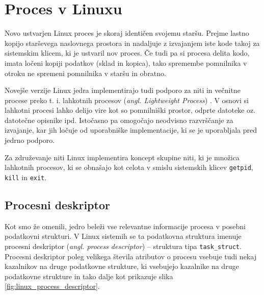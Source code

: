 \documentclass[a4paper,12pt,openright]{book}
\begin{document}
\section{Proces v Linuxu}

Novo ustvarjen Linux proces je skoraj identičen svojemu staršu.
Prejme lastno kopijo starševega naslovnega prostora in nadaljuje z izvajanjem iste kode takoj za sistemskim klicem, ki je ustvaril nov proces.
Če tudi pa si procesa delita kodo, imata ločeni kopiji podatkov (sklad in kopica), tako spremembe pomnilnika v otroku ne spremeni pomnilnika v staršu in obratno.

Novejše verzije Linux jedra implementirajo tudi podporo za niti in večnitne procese preko t. i. lahkotnih procesov (\textit{angl. Lightweight Process}) \cite{Bovet_Cesati_2005}.
V osnovi si lahkotni procesi lahko delijo vire kot so pomnilniški prostor, odprte datoteke oz. datotečne opisnike ipd.
Istočasno pa omogočajo neodvisno razvrščanje za izvajanje, kar jih ločuje od uporabniške implementacije, ki se je uporabljala pred jedrno podporo.

Za združevanje niti Linux implementira koncept skupine niti, ki je množica lahkotnih procesov, ki se obnašajo kot celota v smislu sistemskih klicev \texttt{getpid}, \texttt{kill} in \texttt{exit}.

\subsection{Procesni deskriptor}

Kot smo že omenili, jedro beleži vse relevantne informacije procesa v posebni podatkovni strukturi.
V Linux sistemih se ta podatkovna struktura imenuje procesni deskriptor (\textit{angl. process descriptor}) -- struktura tipa \texttt{task\_struct}.
Procesni deskriptor poleg velikega števila atributov o procesu vsebuje tudi nekaj kazalnikov na druge podatkovne strukture, ki vsebujejo kazalnike na druge podatkovne strukture in tako dalje kot prikazuje slika \ref{fig:linux_process_descriptor}.
\end{document}
